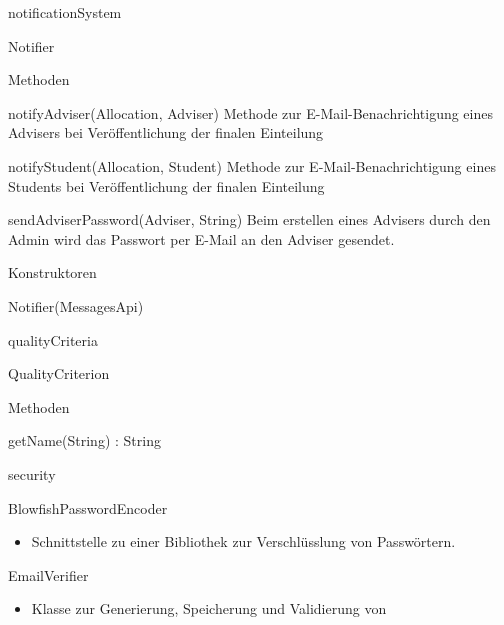 \documentclass[parskip=full]{scrartcl}
\newcommand{\changeDescription}[1]{{\newline\color{black}\normalfont #1}}
\newcommand{\code}[1]{{\ttfamily #1}}
\begin{document}
\begin{itemPackage}
\begin{itemClass}
\end{itemClass}
\item notificationSystem
\begin{itemClass}
\item Notifier
\begin{itemClassSub}
\item Methoden
\begin{itemPlus}
\item notifyAdviser(Allocation, Adviser) \changeDescription{Methode zur
E-Mail-Benachrichtigung eines \code{Advisers} bei Veröffentlichung der finalen
Einteilung}
\item notifyStudent(Allocation, Student) \changeDescription{Methode zur
E-Mail-Benachrichtigung eines \code{Students} bei Veröffentlichung der finalen
Einteilung}
\item sendAdviserPassword(Adviser, String) \changeDescription{Beim erstellen
eines \code{Advisers} durch den Admin wird das Passwort per E-Mail an den
Adviser gesendet.}
\end{itemPlus}
\item Konstruktoren
\begin{itemPlus}
\item Notifier(MessagesApi)
\end{itemPlus}
\end{itemClassSub}
\end{itemClass}
\item qualityCriteria
\begin{itemClass}
\item QualityCriterion
\begin{itemClassSub}
\item Methoden
\begin{itemPlus}
\item getName(String) : String
\end{itemPlus}
\end{itemClassSub}
\end{itemClass}
\item security
\begin{itemClass}
\item BlowfishPasswordEncoder
	\begin{itemize}
	  \item Schnittstelle zu einer Bibliothek zur Verschlüsslung von Passwörtern.
	\end{itemize}
\item EmailVerifier
 \begin{itemize}
	  \item Klasse zur Generierung, Speicherung und Validierung von

\end{itemize}
\end{itemClass}
\end{itemPackage}
\end{document}
